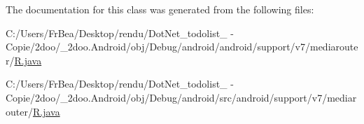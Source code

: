 The documentation for this class was generated from the following files:\begin{CompactItemize}
\item 
C:/Users/FrBea/Desktop/rendu/DotNet\_\-todolist\_ - Copie/2doo/\_\-2doo.Android/obj/Debug/android/android/support/v7/mediarouter/\hyperlink{android_2support_2v7_2mediarouter_2_r_8java}{R.java}\item 
C:/Users/FrBea/Desktop/rendu/DotNet\_\-todolist\_ - Copie/2doo/\_\-2doo.Android/obj/Debug/android/src/android/support/v7/mediarouter/\hyperlink{src_2android_2support_2v7_2mediarouter_2_r_8java}{R.java}\end{CompactItemize}
